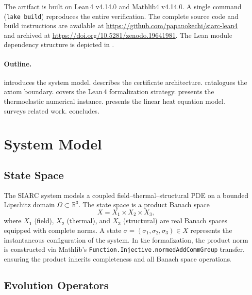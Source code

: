 \documentclass[11pt,a4paper]{article}
\theoremstyle{plain}
\theoremstyle{definition}
\theoremstyle{remark}
\newcommand{\R}{\mathbb{R}}
\newcommand{\leaninline}[1]{\texttt{#1}}
\begin{document}
The artifact is built on Lean\,4 v4.14.0 and Mathlib4 v4.14.0.  A
single command (\texttt{lake build}) reproduces the entire verification.
The complete source code and build instructions are available at
\url{https://github.com/papanokechi/siarc-lean4} and archived at
\url{https://doi.org/10.5281/zenodo.19641981}.
The Lean module dependency structure is depicted in .

\paragraph{Outline.}
 introduces the system model.
 describes the certificate architecture.
 catalogues the axiom boundary.
 covers the Lean\,4 formalization strategy.
 presents the thermoelastic numerical instance.
 presents the linear heat equation model.
 surveys related work.
 concludes.


\section{System Model}\label{sec:model}

\subsection{State Space}

The SIARC system models a coupled field--thermal--structural PDE on a
bounded Lipschitz domain $\Omega \subset \R^3$.  The state space is a
product Banach space
\begin{equation}\label{eq:state-space}
  X = X_1 \times X_2 \times X_3,
\end{equation}
where $X_1$ (field), $X_2$ (thermal), and $X_3$ (structural) are real
Banach spaces equipped with complete norms.  A state
$\sigma = (\sigma_1, \sigma_2, \sigma_3) \in X$ represents the
instantaneous configuration of the system.  In the formalization, the
product norm is constructed via Mathlib's
\leaninline{Function.Injective.normedAddCommGroup} transfer, ensuring
the product inherits completeness and all Banach space operations.

\subsection{Evolution Operators}
\end{document}
